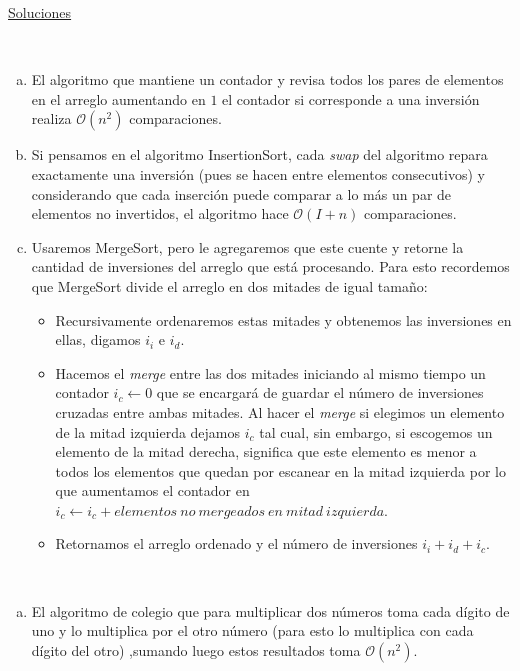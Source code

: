 \documentclass[dcc,uchile]{fcfmcourse}
\begin{document}
\newpage
\begin{center}
{\huge \underline{Soluciones}}
\end{center}
\begin{problems}
\\
\begin{enumerate}[a)]
    \item El algoritmo que mantiene un contador y revisa todos los pares de elementos en el arreglo aumentando en $1$ el contador si corresponde a una inversión realiza $\mathcal{O}(n^2)$ comparaciones.\flash
    \item Si pensamos en el algoritmo InsertionSort, cada \textit{swap} del algoritmo repara exactamente una inversión (pues se hacen entre elementos consecutivos) y considerando que cada inserción puede comparar a lo más un par de elementos no invertidos, el algoritmo hace $\mathcal{O}(I+n)$ comparaciones.\flash
    \item Usaremos MergeSort, pero le agregaremos que este cuente y retorne la cantidad de inversiones del arreglo que está procesando. Para esto recordemos que MergeSort divide el arreglo en dos mitades de igual tamaño:
    \begin{itemize}
        \item Recursivamente ordenaremos estas mitades y obtenemos las inversiones en ellas, digamos $i_{i}$ e $i_{d}$.
        \item Hacemos el \textit{merge} entre las dos mitades iniciando al mismo tiempo un contador $i_{c} \gets 0$ que se encargará de guardar el número de inversiones cruzadas entre ambas mitades. Al hacer el \textit{merge} si elegimos un elemento de la mitad izquierda dejamos $i_{c}$ tal cual, sin embargo, si escogemos un elemento de la mitad derecha, significa que este elemento es menor a todos los elementos que quedan por escanear en la mitad izquierda por lo que aumentamos el contador en $i_{c} \gets i_{c} + elementos\ no\ mergeados\ en\ mitad\ izquierda$.
        \item Retornamos el arreglo ordenado y el número de inversiones $i_{i}+i_{d}+i_{c}$.
    \end{itemize}
\end{enumerate}
\\
\begin{enumerate}[a)]
    \item El algoritmo de colegio que para multiplicar dos números toma cada dígito de uno y lo multiplica por el otro número (para esto lo multiplica con cada dígito del otro) ,sumando luego estos resultados toma $\mathcal{O}(n^2)$.

\end{enumerate}
\end{problems}
\end{document}
